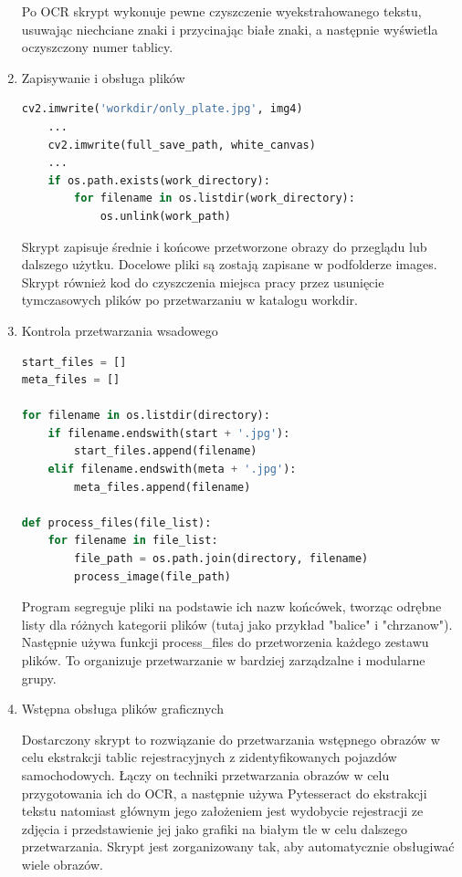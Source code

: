 \documentclass[12pt,a4paper,oneside]{article}
\theoremstyle{definition}
\numberwithin{equation}{section}
\begin{document}
\begin{enumerate}
Po OCR skrypt wykonuje pewne czyszczenie wyekstrahowanego tekstu, usuwając niechciane znaki i przycinając białe znaki, a następnie wyświetla oczyszczony numer tablicy.




\item Zapisywanie i obsługa plików

\begin{adjustbox}{max width=\textwidth}
\begin{lstlisting}[language=Python]
    cv2.imwrite('workdir/only_plate.jpg', img4)
    ...
    cv2.imwrite(full_save_path, white_canvas)
    ...
    if os.path.exists(work_directory):
        for filename in os.listdir(work_directory):
            os.unlink(work_path)
\end{lstlisting} 
\end{adjustbox}


Skrypt zapisuje średnie i końcowe przetworzone obrazy do przeglądu lub dalszego użytku. Docelowe pliki są zostają zapisane w podfolderze images. Skrypt również kod do czyszczenia miejsca pracy przez usunięcie tymczasowych plików po przetwarzaniu w katalogu workdir.

\item Kontrola przetwarzania wsadowego

\begin{adjustbox}{max width=\textwidth}
\begin{lstlisting}[language=Python]
start_files = []
meta_files = []

for filename in os.listdir(directory):
    if filename.endswith(start + '.jpg'):
        start_files.append(filename)
    elif filename.endswith(meta + '.jpg'):
        meta_files.append(filename)

def process_files(file_list):
    for filename in file_list:
        file_path = os.path.join(directory, filename)
        process_image(file_path)

\end{lstlisting} 
\end{adjustbox}

Program segreguje pliki na podstawie ich nazw końcówek, tworząc odrębne listy dla różnych kategorii plików (tutaj jako przykład "balice" i "chrzanow"). Następnie używa funkcji process{\_}files do przetworzenia każdego zestawu plików. To organizuje przetwarzanie w bardziej zarządzalne i modularne grupy.

\item Wstępna obsługa plików graficznych

Dostarczony skrypt to rozwiązanie do przetwarzania wstępnego obrazów w celu ekstrakcji tablic rejestracyjnych z zidentyfikowanych pojazdów samochodowych. Łączy on techniki przetwarzania obrazów w celu przygotowania ich do OCR, a następnie używa Pytesseract do ekstrakcji tekstu natomiast głównym jego założeniem jest wydobycie rejestracji ze zdjęcia i przedstawienie jej jako grafiki na białym tle w celu dalszego przetwarzania. Skrypt jest zorganizowany tak, aby automatycznie obsługiwać wiele obrazów.
\end{enumerate}
\end{document}
